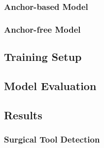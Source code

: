 \subsubsection{Anchor-based Model}

\subsubsection{Anchor-free Model}

\subsection{Training Setup}

\subsection{Model Evaluation}


\subsection{Results}


\subsubsection{Surgical Tool Detection}


